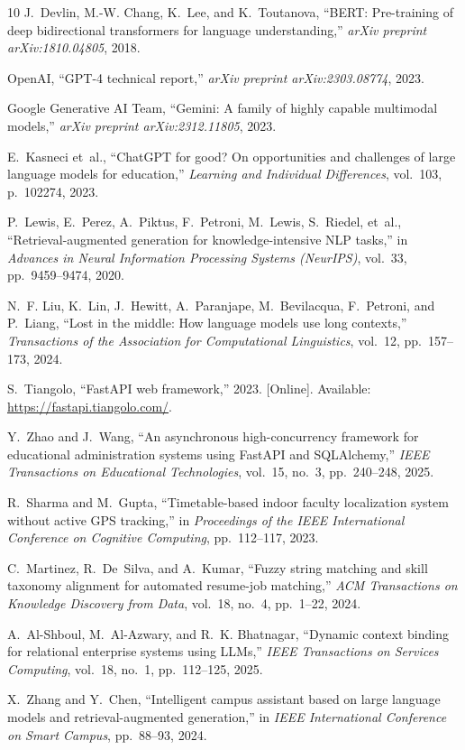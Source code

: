 \documentclass[conference]{IEEEtran}
\begin{document}
\begin{thebibliography}{10}
J.~Devlin, M.-W. Chang, K.~Lee, and K.~Toutanova, ``BERT: Pre-training of deep bidirectional transformers for language understanding,'' {\em arXiv preprint arXiv:1810.04805}, 2018.

OpenAI, ``GPT-4 technical report,'' {\em arXiv preprint arXiv:2303.08774}, 2023.

{Google Generative AI Team}, ``Gemini: A family of highly capable multimodal models,'' {\em arXiv preprint arXiv:2312.11805}, 2023.

E.~Kasneci et~al., ``ChatGPT for good? On opportunities and challenges of large language models for education,'' {\em Learning and Individual Differences}, vol.~103, p.~102274, 2023.

P.~Lewis, E.~Perez, A.~Piktus, F.~Petroni, M.~Lewis, S.~Riedel, et~al., ``Retrieval-augmented generation for knowledge-intensive NLP tasks,'' in {\em Advances in Neural Information Processing Systems (NeurIPS)}, vol.~33, pp.~9459--9474, 2020.

N.~F. Liu, K.~Lin, J.~Hewitt, A.~Paranjape, M.~Bevilacqua, F.~Petroni, and P.~Liang, ``Lost in the middle: How language models use long contexts,'' {\em Transactions of the Association for Computational Linguistics}, vol.~12, pp.~157--173, 2024.

S.~Tiangolo, ``FastAPI web framework,'' 2023. [Online]. Available: \url{https://fastapi.tiangolo.com/}.

Y.~Zhao and J.~Wang, ``An asynchronous high-concurrency framework for educational administration systems using FastAPI and SQLAlchemy,'' {\em IEEE Transactions on Educational Technologies}, vol.~15, no.~3, pp.~240--248, 2025.

R.~Sharma and M.~Gupta, ``Timetable-based indoor faculty localization system without active GPS tracking,'' in {\em Proceedings of the IEEE International Conference on Cognitive Computing}, pp.~112--117, 2023.

C.~Martinez, R.~De~Silva, and A.~Kumar, ``Fuzzy string matching and skill taxonomy alignment for automated resume-job matching,'' {\em ACM Transactions on Knowledge Discovery from Data}, vol.~18, no.~4, pp.~1--22, 2024.

A.~Al-Shboul, M.~Al-Azwary, and R.~K. Bhatnagar, ``Dynamic context binding for relational enterprise systems using LLMs,'' {\em IEEE Transactions on Services Computing}, vol.~18, no.~1, pp.~112--125, 2025.

X.~Zhang and Y.~Chen, ``Intelligent campus assistant based on large language models and retrieval-augmented generation,'' in {\em IEEE International Conference on Smart Campus}, pp.~88--93, 2024.

\end{thebibliography}
\end{document}
